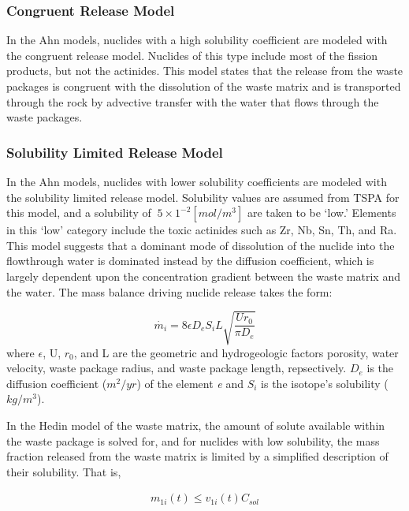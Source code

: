 \subsubsection{Congruent Release Model} 

In the Ahn models, nuclides with a high solubility coefficient are 
modeled with the congruent release model.  Nuclides of this type 
include most of the fission products, but not the actinides. This 
model states that the release from the waste packages is congruent 
with the dissolution of the waste matrix and is transported through 
the rock by advective transfer with the water that flows through the 
waste packages.  

\subsubsection{Solubility Limited Release Model}

In the Ahn models, nuclides with lower solubility coefficients are 
modeled with the solubility limited release model.  Solubility values 
are assumed from TSPA for this model, and a solubility of $~5\times 
1^{-2} [mol/m^3]$ are taken to be `low.' Elements in this `low' 
category include the toxic actinides such as Zr, Nb, Sn, Th, and Ra.  
This model suggests that a dominant mode of dissolution of the nuclide 
into the flowthrough water is dominated instead by the diffusion 
coefficient, which is largely dependent upon the concentration 
gradient between the waste matrix and the water. The mass balance 
driving nuclide release takes the form:

\begin{equation}
\dot{m_i}=8\epsilon D_eS_iL\sqrt{\frac{Ur_0}{\pi D_e}}
\end{equation}
where $\epsilon$, U, $r_0$, and L are the geometric and hydrogeologic 
factors porosity, water velocity, waste package radius, and waste 
package length, repsectively. $D_e$ is the diffusion coefficient 
($m^2/yr$) of the element \emph{e} and $S_i$ is the isotope's 
solubility ($kg/m^3$).

In the Hedin model of the waste matrix, the amount of solute available 
within the waste package is solved for, and for nuclides with low 
solubility, the mass fraction released from the waste matrix is 
limited by a simplified description of their solubility. That is, 

\begin{align*}
  m_{1i}(t)\le v_{1i}(t)C_{sol}
\end{align*}

